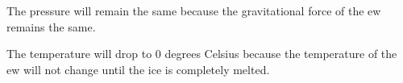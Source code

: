 The pressure will remain the same because the gravitational force of the ew remains the same.

The temperature will drop to 0 degrees Celsius because the temperature of the ew will not change until the ice is completely melted.